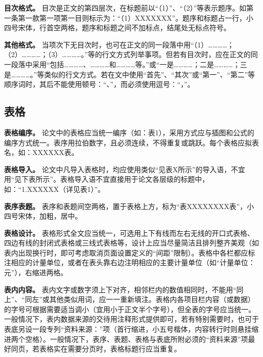 \documentclass[singlesided]{Style/ucasthesis}%
\begin{document}
\textbf{目次格式。} 目次是正文的第四层次，在标题前以``（1）''、``（2）''等表示题序。如第一条第一款第一项第一目则标示为：``（1）XXXXXXX''。题序和标题占一行，小四号宋体，行首空两格，题序和标题之间不加标点，结尾处无标点符号。

\textbf{其他格式。} 当项次下无目次时，也可在正文的同一段落中用``（1）\ldots{}\ldots{}\ldots{}\ldots{}；（2）\ldots{}\ldots{}\ldots{}\ldots{}；（3）\ldots{}\ldots{}\ldots{}\ldots{}。''等的行文方式列举事项。但若有目次时，应在正文的同一段落中采用``包括\ldots{}\ldots{}\ldots{}\ldots{}、\ldots{}\ldots{}\ldots{}\ldots{}和\ldots{}\ldots{}\ldots{}\ldots{}等。''或``一是\ldots{}\ldots{}\ldots{}\ldots{}；二是\ldots{}\ldots{}\ldots{}\ldots{}；三是\ldots{}\ldots{}\ldots{}\ldots{}。''等类似的行文方式。若在文中使用``首先''、``其次''或``第一''、``第二''等顺序词时，其后不能使用顿号：``、''，而必须使用逗号：``，''。

\hypertarget{section-26}{%
\subsection{表格}\label{section-26}}

\textbf{表格编序。} 论文中的表格应当统一编序（如：表1），采用方式应与插图和公式的编序方式统一。表序用拉伯数字，且必须连续，不得重复或跳跃。每个表格应拟表名，如：XXXXXX表。

\textbf{表格导入。} 论文中凡导入表格时，均应使用类似``见表X所示''的导入语，不宜用``见下表所示''。表格导入语不宜直接用于论文各层级的标题中，如：``1.XXXXXX（详见表1）''。

\textbf{表序表题。} 表序和表题间空两格，置于表格上方，标为``表XXXXXXXX表''，小四号宋体，加粗，居中。

\textbf{表格设计。} 表格形式全文应当统一，可选用上下有线而左右无线的开口式表格、四边有线的封闭式表格或三线式表格等，设计上应当尽量简洁且排列整齐美观（如表内出现换行时，即可考虑取消页面设置定义的``间距''限制）。表格中各栏都应标注相应的计量单位，或者在表头靠右边注明相应的主要计量单位（如``计量单位：元''），右缩进两格。

\textbf{表内内容。} 表内文字或数字须上下对齐，相邻栏内的数值相同时，不能用``同上''、``同左''或其他类似用词，应一一重新填注。表格内各项目栏内容（或数据）的字号可根据需要适当调小（宜用小于正文半个字号），但全表的字号应当统一。一般情况下，表内数据来源的交待用注释形式提供即可，若有特别需要时，也可于表底另设一段专列``资料来源：''项（首行缩进，小五号楷体，内容转行时则悬挂缩进两个空格）。一般情况下，表序、表题、表格与表底所附必须的``资料来源''项最好同页，若表格实在需要分页时，表格标题行应当重复。
\end{document}
